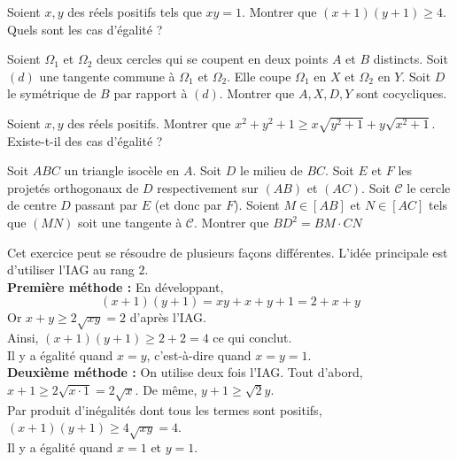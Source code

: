 

\begin{exo}
Soient $x, y$ des réels positifs tels que $xy=1$. Montrer que $(x+1)(y+1) \ge 4$. Quels sont les cas d'égalité ?
\end{exo}


\begin{exo}
Soient $\Omega_1$ et $\Omega_2$ deux cercles qui se coupent en deux points $A$ et $B$ distincts. Soit $(d)$ une tangente commune à $\Omega_1$ et $\Omega_2$. Elle coupe $\Omega_1$ en $X$ et $\Omega_2$ en $Y$. Soit $D$ le symétrique de $B$ par rapport à $(d)$. Montrer que $A, X, D, Y$ sont cocycliques. 
\end{exo}


\begin{exo}
Soient $x, y$ des réels positifs. Montrer que $x^2+y^2+1 \ge x\sqrt{y^2+1} + y\sqrt{x^2+1}$. Existe-t-il des cas d'égalité ?
\end{exo}


\begin{exo}
Soit $ABC$ un triangle isocèle en $A$. Soit $D$ le milieu de $BC$. Soit $E$ et $F$ les projetés orthogonaux de $D$ respectivement sur $(AB)$ et $(AC)$. Soit $\mathcal{C}$ le cercle de centre $D$ passant par $E$ (et donc par $F$). Soient $M \in [AB]$ et $N \in [AC]$ tels que $(MN)$ soit une tangente à $\mathcal{C}$. Montrer que $BD^2= BM \cdot CN$
\end{exo}




\begin{sol}
Cet exercice peut se résoudre de plusieurs façons différentes. L'idée principale est d'utiliser l'IAG au rang $2$. \\
\textbf{Première méthode :} En développant,
$$(x + 1)(y + 1) = xy + x + y + 1 = 2 + x + y$$
Or $x+ y  \ge 2\sqrt{xy} = 2$ d'après l'IAG. \\
Ainsi, $(x + 1)(y + 1) \ge 2 + 2 = 4$ ce qui conclut. \\
Il y a égalité quand $x = y$, c'est-à-dire quand $x = y = 1$. \\
\textbf{Deuxième méthode :} On utilise deux fois l'IAG. Tout d'abord, $x + 1 \ge 2 \sqrt{x \cdot 1} = 2 \sqrt{x}$. De même, $y+1 \ge \sqrt 2{y}$. \\
Par produit d'inégalités dont tous les termes sont positifs, $(x+1)(y+1) \ge 4\sqrt{xy} = 4$. \\
Il y a égalité quand $x = 1$ et $y = 1$.
\end{sol}


